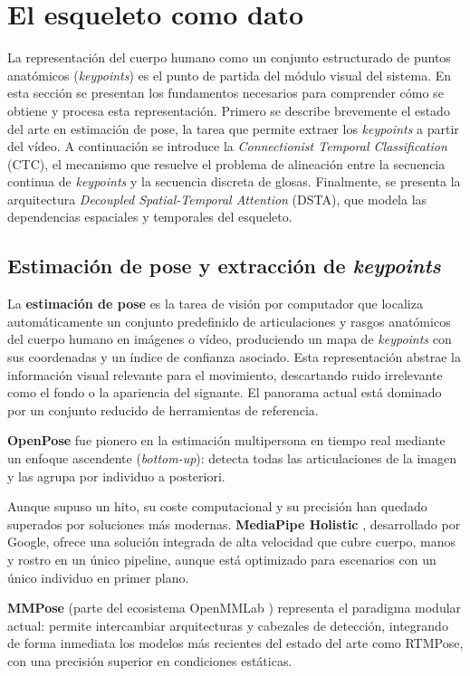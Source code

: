 \section{El esqueleto como dato}
La representación del cuerpo humano como un conjunto estructurado de puntos anatómicos (\textit{keypoints}) es el punto de partida del módulo visual del sistema.
En esta sección se presentan los fundamentos necesarios para comprender cómo se obtiene y procesa esta representación.
Primero se describe brevemente el estado del arte en estimación de pose, la tarea que permite extraer los \textit{keypoints} a partir del vídeo.
A continuación se introduce la \textit{Connectionist Temporal Classification} (CTC), el mecanismo que resuelve el problema de alineación entre la secuencia continua de \textit{keypoints} y la secuencia discreta de glosas.
Finalmente, se presenta la arquitectura \textit{Decoupled Spatial-Temporal Attention} (DSTA), que modela las dependencias espaciales y temporales del esqueleto.

\subsection{Estimación de pose y extracción de \textit{keypoints}}\label{sub:pose-estimation}
La \textbf{estimación de pose} es la tarea de visión por computador que localiza automáticamente un conjunto predefinido de articulaciones y rasgos anatómicos del cuerpo humano en imágenes o vídeo, produciendo un mapa de \textit{keypoints} con sus coordenadas y un índice de confianza asociado.
Esta representación abstrae la información visual relevante para el movimiento, descartando ruido irrelevante como el fondo o la apariencia del signante.
El panorama actual está dominado por un conjunto reducido de herramientas de referencia.

\textbf{OpenPose} \cite{OpenPose} fue pionero en la estimación multipersona en tiempo real mediante un enfoque ascendente (\textit{bottom-up}): detecta todas las articulaciones de la imagen y las agrupa por individuo a posteriori.

Aunque supuso un hito, su coste computacional y su precisión han quedado superados por soluciones más modernas.
\textbf{MediaPipe Holistic} \cite{mediapipe}, desarrollado por Google, ofrece una solución integrada de alta velocidad que cubre cuerpo, manos y rostro en un único pipeline, aunque está optimizado para escenarios con un único individuo en primer plano.

\textbf{MMPose} (parte del ecosistema OpenMMLab \cite{mmpose2020}) representa el paradigma modular actual: permite intercambiar arquitecturas y cabezales de detección, integrando de forma inmediata los modelos más recientes del estado del arte como RTMPose, con una precisión superior en condiciones estáticas.

